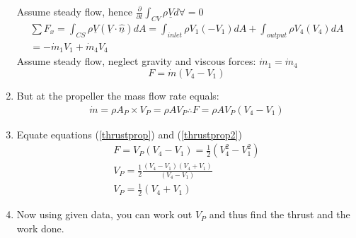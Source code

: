 \documentclass[class=report, crop=false, 12pt,a4paper]{standalone}
\begin{document}
\begin{enumerate}[noitemsep]
    Assume steady flow, hence $\frac{\partial}{\partial t} \int_{CV} \rho \underline{V} d \forall =0$
      \begin{gather}
        \sum F_x = \int_{CS} \rho \underline{V} (\underline{V} \cdot \underline{\hat{n}}) dA = \int_{inlet} \rho V_1 (-V_1) dA + \int_{output} \rho V_4 (V_4) dA\\
        = -\dot{m}_1 V_1 + \dot{m}_4 V_4
      \end{gather}
    Assume steady flow, neglect gravity and viscous forces: $\dot{m}_1 = \dot{m}_4$
      \begin{equation}
        F = \dot{m}(V_4 - V_1)
      \end{equation}
  \item But at the propeller the mass flow rate equals:
    \begin{gather}
      \dot{m} = \rho A_P \times V_P = \rho A V_P
      \therefore F = \rho A V_P (V_4 - V_1) \label{thrustprop2}
    \end{gather}
  \item Equate equations (\ref{thrustprop}) and (\ref{thrustprop2})
    \begin{gather}
      F = V_P (V_4 - V_1) = \frac{1}{2}(V_4^2 - V_1^2)\\
      V_P = \frac{1}{2}\frac{(V_4 - V_1)(V_4 + V_1 )}{(V_4 - V_1)}\\
      V_P = \frac{1}{2}(V_4 + V_1 )
    \end{gather}
  \item Now using given data, you can work out $V_P$ and thus find the thrust and the work done.
\end{enumerate}
\end{document}
